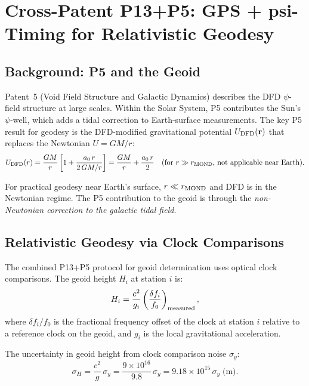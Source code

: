 \documentclass[aps,prd,twocolumn,superscriptaddress,nofootinbib]{revtex4-2}
\begin{document}
\section{Cross-Patent P13+P5: GPS + psi-Timing for Relativistic Geodesy}

\subsection{Background: P5 and the Geoid}

Patent~5 (Void Field Structure and Galactic Dynamics) describes the
DFD $\psi$-field structure at large scales. Within the Solar System,
P5 contributes the Sun's $\psi$-well, which adds a tidal correction
to Earth-surface measurements. The key P5 result for geodesy is the
DFD-modified gravitational potential $U_{\rm DFD}(\mathbf{r})$ that
replaces the Newtonian $U = GM/r$:
\begin{equation}
U_{\rm DFD}(r) = \frac{GM}{r}\left[1 + \frac{a_0\,r}{2\,GM/r}\right]
= \frac{GM}{r} + \frac{a_0\,r}{2}
\quad\text{(for $r \gg r_{\rm MOND}$, not applicable near Earth)}.
\end{equation}

For practical geodesy near Earth's surface, $r \ll r_{\rm MOND}$ and
DFD is in the Newtonian regime. The P5 contribution to the geoid
is through the \emph{non-Newtonian correction to the galactic tidal field}.

\subsection{Relativistic Geodesy via Clock Comparisons}

The combined P13+P5 protocol for geoid determination uses optical
clock comparisons. The geoid height $H_i$ at station $i$ is:
\begin{equation}
H_i = \frac{c^2}{g_i}\left(\frac{\delta f_i}{f_0}\right)_{\rm measured},
\label{eq:geoid_clock}
\end{equation}
where $\delta f_i/f_0$ is the fractional frequency offset of the clock
at station $i$ relative to a reference clock on the geoid, and $g_i$
is the local gravitational acceleration.

The uncertainty in geoid height from clock comparison noise $\sigma_y$:
\begin{equation}
\sigma_{H} = \frac{c^2}{g}\,\sigma_y
= \frac{9\times10^{16}}{9.8}\,\sigma_y
= 9.18\times10^{15}\,\sigma_y\;\text{(m)}.
\label{eq:geoid_uncertainty}
\end{equation}
\end{document}
